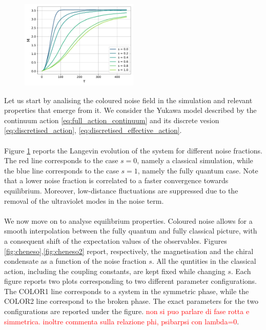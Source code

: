 \begin{figure}
    \centering
    \includegraphics[width=0.5\textwidth]{figures/thermalisation_broken.pdf}
    \caption{}
    \label{fig:thermalisation_different_noise_fracs}
\end{figure}

Let us start by analising the coloured noise field in the simulation and relevant properties that emerge from it. We consider the Yukawa model described by the continuum action \eqref{eq:full_action_continuum} and its discrete vesion \eqref{eq:discretised_action}, \eqref{eq:discretised_effective_action}. \\~\\
Figure \ref{fig:thermalisation_different_noise_fracs} reports the Langevin evolution of the system for different noise fractions. The red line corresponds to the case $s=0$, namely a classical simulation, while the blue line corresponds to the case $s=1$, namely the fully quantum case. 
Note that a lower noise fraction is correlated to a faster convergence towards equilibrium. Moreover, low-distance fluctuations are suppressed due to the removal of the ultraviolet modes in the noise term. \\~\\
We now move on to analyse equilibrium properties. Coloured noise allows for a smooth interpolation between the fully quantum and fully classical picture, with a consequent shift of the expectation values of the observables. Figures \ref{fig:cheneso},\ref{fig:cheneso2} report, respectively, the magnetisation and the chiral condensate as a function of the noise fraction $s$. All the quntities in the classical action, including the coupling constants, are kept fixed while changing $s$.
Each figure reports two plots corresponding to two different parameter configurations. The COLOR1 line corresponds to a system in the symmetric phase, while the COLOR2 line correspond to the broken phase. The exact parameters for the two configurations are reported under the figure.
\textcolor{red}{non si puo parlare di fase rotta e simmetrica. inoltre commenta sulla relazione phi, psibarpsi con lambda=0}.

